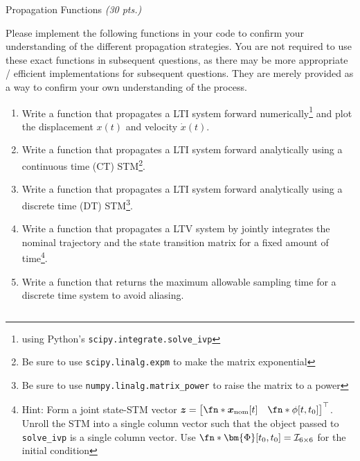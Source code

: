 \begin{hwkProblem}{1}{Propagation Functions \textit{(30 pts.)}} \label{hwk:p01}

	Please implement the following functions in your code to confirm your understanding of the different propagation strategies. You are not required to use these exact functions in subsequent questions, as there may be more appropriate / efficient implementations for subsequent questions. They are merely provided as a way to confirm your own understanding of the process.
	\begin{enumerate}[label=(\alph*)]
		\item \label{hwk:p01a} Write a function that propagates a LTI system forward numerically\footnote{using Python's \texttt{scipy.integrate.solve_ivp}} and plot the displacement \(x(t)\) and velocity \(\dot{x}(t)\).
		\item \label{hwk:p01b} Write a function that propagates a LTI system forward analytically using a continuous time (CT) STM\footnote{Be sure to use \texttt{scipy.linalg.expm} to make the matrix exponential}.
		\item \label{hwk:p01c} Write a function that propagates a LTI system forward analytically using a discrete time (DT) STM\footnote{Be sure to use \texttt{numpy.linalg.matrix_power} to raise the matrix to a power}.
		\item \label{hwk:p01d} Write a function that propagates a LTV system by jointly integrates the nominal trajectory and the state transition matrix for a fixed amount of time\footnote{Hint: Form a joint state-STM vector \(\boldsymbol{z}={\begin{bmatrix}\fn*{\boldsymbol{x}_{\text{nom}}}[t] & \fn*{\phi}[t, t_0]\end{bmatrix}}^{\top}\). Unroll the STM into a single column vector such that the object passed to \texttt{solve_ivp} is a single column vector. Use \(\fn*{\bm{\Phi}}[t_0, t_0]=\mathcal{I}_{6\times6}\) for the initial condition}.
		\item \label{hwk:p01e} Write a function that returns the maximum allowable sampling time for a discrete time system to avoid aliasing.
	\end{enumerate}

	\hwkSol{} \label{hwk:s01}

	\hwkPart{} \label{hwk:s01a}

	\inputminted[firstline=122, lastline=153]{python}{./src/hw03.py}

	\hwkPart{} \label{hwk:s01b}


\end{hwkProblem}
